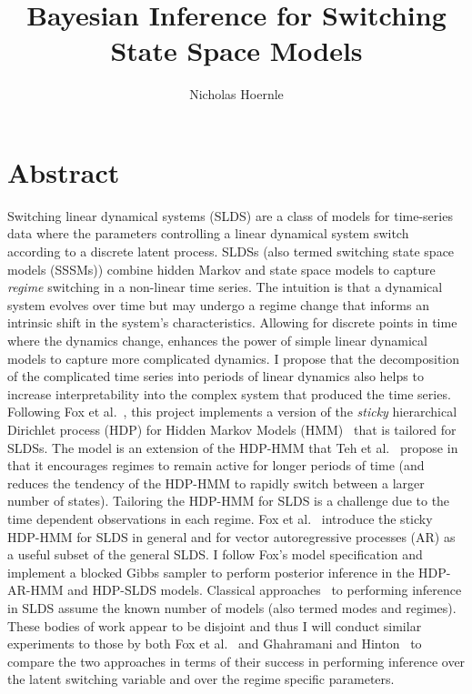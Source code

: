 \documentclass[twoside]{article}
\title{Bayesian Inference for Switching State Space Models}
\author{Nicholas Hoernle}
\begin{document}
\maketitle
\section{Abstract}
Switching linear dynamical systems (SLDS) are a class of models for time-series data where the parameters controlling a linear dynamical system switch according to a discrete latent process. SLDSs (also termed switching state space models (SSSMs)) combine hidden Markov and state space models to capture \textit{regime} switching in a non-linear time series. The intuition is that a dynamical system evolves over time but may undergo a regime change that informs an intrinsic shift in the system's characteristics. Allowing for discrete points in time where the dynamics change, enhances the power of simple linear dynamical models to capture more complicated dynamics. I propose that the decomposition of the complicated time series into periods of linear dynamics also helps to increase interpretability into the complex system that produced the time series. Following Fox et al.~\cite{fox2011bayesian}, this project implements a version of the \textit{sticky} hierarchical Dirichlet process (HDP) for Hidden Markov Models (HMM)~\cite{fox2008hdp} that is tailored for SLDSs. The model is an extension of the HDP-HMM that Teh et al.~\cite{teh2005sharing} propose in that it encourages regimes to remain active for longer periods of time (and reduces the tendency of the HDP-HMM to rapidly switch between a larger number of states). Tailoring the HDP-HMM for SLDS is a challenge due to the time dependent observations in each regime. Fox et al.~\cite{fox2011bayesian} introduce the sticky HDP-HMM for SLDS in general and for vector autoregressive processes (AR) as a useful subset of the general SLDS. I follow Fox's model specification and implement a blocked Gibbs sampler to perform posterior inference in the HDP-AR-HMM and HDP-SLDS models. Classical approaches~\cite{kim1999state,ghahramani2000variational} to performing inference in SLDS assume the known number of models (also termed modes and regimes). These bodies of work appear to be disjoint and thus I will conduct similar experiments to those by both Fox et al.~\cite{fox2011bayesian} and Ghahramani and Hinton~\cite{ghahramani2000variational} to compare the two approaches in terms of their success in performing inference over the latent switching variable and over the regime specific parameters.
\end{document}
